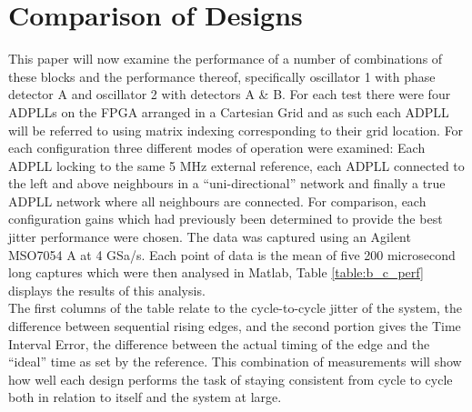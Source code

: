 \documentclass[conference]{IEEEtran}
\begin{document}
{\section{Comparison of Designs}
This paper will now examine the performance of a number of combinations of these blocks and the performance thereof, specifically oscillator 1 with phase detector A and oscillator 2 with detectors A \& B. For each test there were four ADPLLs on the FPGA arranged in a Cartesian Grid and as such each ADPLL will be referred to using matrix indexing corresponding to their grid location. For each configuration three different modes of operation were examined: Each ADPLL locking to the same 5 MHz external reference, each ADPLL connected to the left and above neighbours in a ``uni-directional'' network and finally a true ADPLL network where all neighbours are connected. For comparison, each configuration gains which had previously been determined to provide the best jitter performance were chosen. The data was captured using an Agilent MSO7054 A at 4 GSa/s. Each point of data is the mean of five 200 microsecond long captures which were then analysed in Matlab, Table \ref{table:b_c_perf} displays the results of this analysis.\\
The first columns of the table relate to the cycle-to-cycle jitter of the system, the difference between sequential rising edges, and the second portion gives the Time Interval Error, the difference between the actual timing of the edge and the ``ideal'' time as set by the reference. This combination of measurements will show how well each design performs the task of staying consistent from cycle to cycle both in relation to itself and the system at large.

}
\end{document}
